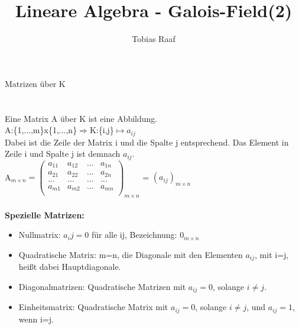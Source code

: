 \documentclass{scrartcl}
\title{Lineare Algebra - Galois-Field(2)}
\author{Tobias Raaf}
\begin{document}
	\Large Matrizen über K\\\\
	\normalsize\\
	Eine Matrix A über K ist eine Abbildung.\\
	A:\{1,...,m\}x\{1,...,n\}$\Rightarrow$K:\{i,j\}$\mapsto a_{ij}$\\
	Dabei ist die Zeile der Matrix i und die Spalte j entsprechend. Das Element in Zeile i und Spalte j ist demnach $a_{ij}$.\\
	A$_{m\times n}=\begin{pmatrix}
	a_{11} & a_{12} & ... & a_{1n}\\
	a_{21} & a_{22} & ... & a_{2n}\\
	...    & ...    & ... & ...   \\
	a_{m1} & a_{m2} & ... & a_{mn}\\
	\end{pmatrix}_{m\times n}$ = $(a_{ij})_{m \times n}$\\
	\\
   \textbf{Spezielle Matrizen:}\\ 
   \begin{itemize}
   	\item Nullmatrix: $a_ij=0$ für alle ij, Bezeichnung: $0_{m\times n}$\\
   	\item Quadratische Matrix: m=n, die Diagonale mit den Elementen $a_{ij}$, mit i=j, heißt dabei Hauptdiagonale.\\
   	\item Diagonalmatrizen: Quadratische Matrizen mit $a_{ij}=0$, solange $i\neq j$.\\
   	\item Einheitsmatrix: Quadratische Matrix mit $a_{ij}=0$, solange $i\neq j$, und $a_{ij}=1$, wenn i=j.\\ 
   	
   \end{itemize}
	
\end{document}
